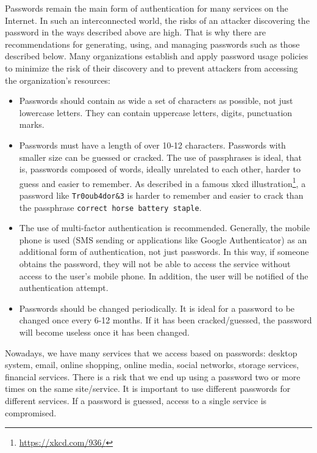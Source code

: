Passwords remain the main form of authentication for many services on the Internet.
In such an interconnected world, the risks of an attacker discovering the password in the ways described above are high.
That is why there are recommendations for generating, using, and managing passwords such as those described below.
Many organizations establish and apply password usage policies to minimize the risk of their discovery and to prevent attackers from accessing the organization's resources:

\begin{itemize}
  \item Passwords should contain as wide a set of characters as possible, not just lowercase letters.
    They can contain uppercase letters, digits, punctuation marks.
  \item Passwords must have a length of over 10-12 characters.
    Passwords with smaller size can be guessed or cracked.
    The use of passphrases is ideal, that is, passwords composed of words, ideally unrelated to each other, harder to guess and easier to remember.
    As described in a famous xkcd illustration\footnote{\url{https://xkcd.com/936/}}, a password like \texttt{Tr0oub4dor\&3} is harder to remember and easier to crack than the passphrase \texttt{correct horse battery staple}.
  \item The use of multi-factor authentication is recommended.
    Generally, the mobile phone is used (SMS sending or applications like Google Authenticator) as an additional form of authentication, not just passwords.
    In this way, if someone obtains the password, they will not be able to access the service without access to the user's mobile phone.
    In addition, the user will be notified of the authentication attempt.
  \item Passwords should be changed periodically.
    It is ideal for a password to be changed once every 6-12 months.
    If it has been cracked/guessed, the password will become useless once it has been changed.
\end{itemize}

Nowadays, we have many services that we access based on passwords: desktop system, email, online shopping, online media, social networks, storage services, financial services.
There is a risk that we end up using a password two or more times on the same site/service.
It is important to use different passwords for different services.
If a password is guessed, access to a single service is compromised.


